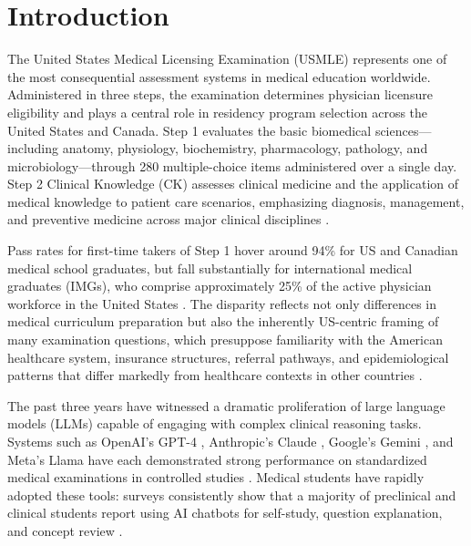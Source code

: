 \section{Introduction}

The United States Medical Licensing Examination (USMLE) represents one of the most consequential assessment systems in medical education worldwide. Administered in three steps, the examination determines physician licensure eligibility and plays a central role in residency program selection across the United States and Canada. Step 1 evaluates the basic biomedical sciences—including anatomy, physiology, biochemistry, pharmacology, pathology, and microbiology—through 280 multiple-choice items administered over a single day. Step 2 Clinical Knowledge (CK) assesses clinical medicine and the application of medical knowledge to patient care scenarios, emphasizing diagnosis, management, and preventive medicine across major clinical disciplines \parencite{usmle2024}.

Pass rates for first-time takers of Step 1 hover around 94\% for US and Canadian medical school graduates, but fall substantially for international medical graduates (IMGs), who comprise approximately 25\% of the active physician workforce in the United States \parencite{nrmp2023}. The disparity reflects not only differences in medical curriculum preparation but also the inherently US-centric framing of many examination questions, which presuppose familiarity with the American healthcare system, insurance structures, referral pathways, and epidemiological patterns that differ markedly from healthcare contexts in other countries \parencite{boulet2006}.

The past three years have witnessed a dramatic proliferation of large language models (LLMs) capable of engaging with complex clinical reasoning tasks. Systems such as OpenAI's GPT-4 \parencite{openai2023gpt4}, Anthropic's Claude \parencite{anthropic2024claude3}, Google's Gemini \parencite{anil2023gemini}, and Meta's Llama \parencite{touvron2023llama2} have each demonstrated strong performance on standardized medical examinations in controlled studies \parencite{nori2023gpt4usmle, kung2023chatgptusmle}. Medical students have rapidly adopted these tools: surveys consistently show that a majority of preclinical and clinical students report using AI chatbots for self-study, question explanation, and concept review \parencite{huh2023medstudents}.

